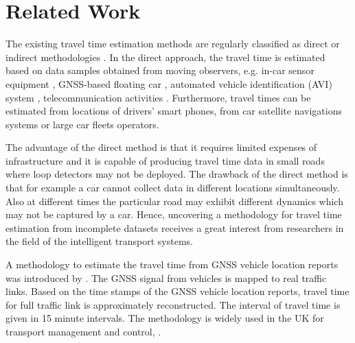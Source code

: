 \documentclass[journal]{IEEEtran}
\begin{document}
\section{Related Work}
\label{sec:related_work}

The existing travel time estimation methods are regularly classified as direct or indirect methodologies \cite{Lu2018}. In the direct approach, the travel time is estimated based on data samples obtained from moving observers, e.g. in-car sensor equipment \cite{Yeon2007,Ernst2014,Guo2015}, GNSS-based floating car \cite{Fabritiis2008,Hadachi2013,Maiti2014,Rahmani2014,Wang2012,Jones2013,Su2010,Lee2017,DepartmentofTransport2016}, automated vehicle identification (AVI) system \cite{Rahmani2014,Ma2008}, telecommunication activities \cite{Vidovic2017, Derrmann2016, Chitraranjan2016, Chitraranjan2015}. Furthermore, travel times can be estimated from locations of drivers' smart phones, from car satellite navigations systems or large car fleets operators. 

The advantage of the direct method is that it requires limited expenses of infrastructure and it is capable of producing travel time data in small roads where loop detectors may not be deployed. The drawback of the direct method is that for example a car cannot collect data in different locations simultaneously. Also at different times the particular road may exhibit different dynamics which may not be captured by a car. Hence, uncovering a methodology for travel time estimation from incomplete datasets receives a great interest from researchers in the field of the intelligent transport systems.

A methodology to estimate the travel time from GNSS vehicle location reports was introduced by \cite{DepartmentofTransport2016}. The GNSS signal from vehicles is mapped to real traffic links. Based on the time stamps of the GNSS vehicle location reports, travel time for full traffic link is approximately reconstructed. The interval of travel time is given in 15 minute intervals. The methodology is widely used in the UK for transport management and control, \cite{DepartmentofTransport2016, Vu2017}.
\end{document}
